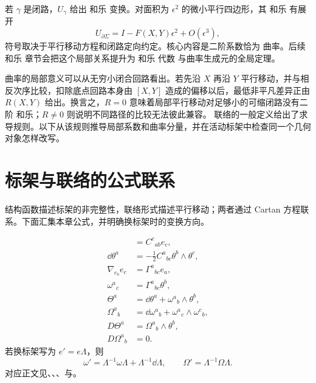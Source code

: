 若 $\gamma$ 是闭路，$U_\gamma$ 给出 和乐 变换。对面积为 $\epsilon^2$ 的微小平行四边形，其 和乐 有展开
\begin{equation*}U_{\partial\Sigma}
=I-
F(X,Y)\epsilon^2+O(\epsilon^3),\end{equation*}
符号取决于平行移动方程和闭路定向约定。核心内容是二阶系数恰为 曲率。后续 和乐 章节会把这个局部关系提升为 和乐 代数 与曲率生成元的全局定理。

曲率的局部意义可以从无穷小闭合回路看出。若先沿 $X$ 再沿 $Y$ 平行移动，并与相反次序比较，扣除底点回路本身由 $[X,Y]$ 造成的偏移以后，最低非平凡差异正由 $R(X,Y)$ 给出。换言之，$R=0$ 意味着局部平行移动对足够小的可缩闭路没有二阶 和乐；$R\neq0$ 则说明不同路径的比较无法彼此兼容。
联络的一般定义给出了求导规则。以下从该规则推导局部系数和曲率分量，并在活动标架中检查同一个几何对象怎样改写。






\section{标架与联络的公式联系}
结构函数描述标架的非完整性，联络形式描述平行移动；两者通过 Cartan 方程联系。下面汇集本章公式，并明确换标架时的变换方向。
\begin{note}[公式之间的联系]
\begin{align*}
[e_a,e_b]&=C^c{}_{ab}e_c,\\
\dd\theta^a&=-\frac12C^a{}_{bc}\theta^b\wedge\theta^c,\\
\nabla_{e_b}e_c&=\Gamma^a{}_{bc}e_a,\\
\omega^a{}_c&=\Gamma^a{}_{bc}\theta^b,\\
\Theta^a&=\dd\theta^a+\omega^a{}_b\wedge\theta^b,\\
\Omega^a{}_b&=\dd\omega^a{}_b+\omega^a{}_c\wedge\omega^c{}_b,\\
D\Theta^a&=\Omega^a{}_b\wedge\theta^b,\\
D\Omega^a{}_b&=0.
\end{align*}
若换标架写为 \(e' = e\Lambda\)，则
\[
\omega'=\Lambda^{-1}\omega\Lambda+\Lambda^{-1}\dd\Lambda,
\qquad
\Omega'=\Lambda^{-1}\Omega\Lambda.
\]
对应正文见、、、与。
\end{note}


